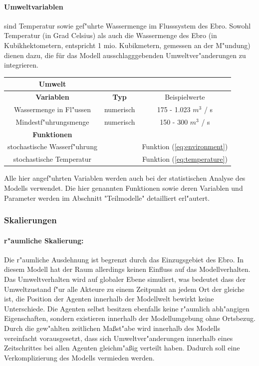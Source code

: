 \documentclass[11pt,a4paper]{article}
\begin{document}
\paragraph{Umweltvariablen}sind Temperatur sowie gef"uhrte Wassermenge im Fluss\-system des Ebro. Sowohl Temperatur (in Grad Celsius) als auch die Wassermenge des Ebro (in Kubikhektometern, entspricht 1 mio. Kubikmetern, gemessen an der M"undung) dienen dazu, die f\"ur das Modell ausschlagggebenden Umweltver"anderungen zu integrieren. \\

\begin{tabular}{|c|c|c|}
\hline \textbf{Umwelt} & & \\ 
\hline \textbf{Variablen} & \textbf{Typ} & Beispielwerte\\ 
\hline Wassermenge in Fl"ussen & numerisch & 175 - 1.023 $m^3$ / s \\ 
\hline Mindestf"uhrungsmenge & numerisch & 150 - 300 $m^3$ / s \\ 
\hline \textbf{Funktionen} & & \\ 
\hline stochastische Wasserf"uhrung & & Funktion (\ref{eq:environment})\\
\hline stochastische Temperatur & & Funktion (\ref{eq:temperature})\\
\hline 
\end{tabular}

\newline
Alle hier angef"uhrten Variablen werden auch bei der statistischen Analyse des Modells verwendet. Die hier genannten Funktionen sowie deren Variablen und Parameter werden im Abschnitt "Teilmodelle" detailliert erl"autert.\\

\subsubsection{Skalierungen}\label{sec:Skalierungen}

\paragraph*{r"aumliche Skalierung:}
Die r"aumliche Ausdehnung ist begrenzt durch das Einzugsgebiet des Ebro. In diesem Modell hat der Raum allerdings keinen Einfluss auf das Modellverhalten. Das Umweltverhalten wird auf globaler Ebene simuliert, was bedeutet dass der Umweltzustand f"ur alle Akteure zu einem Zeitpunkt an jedem Ort der gleiche ist, die Position der Agenten innerhalb der Modellwelt bewirkt keine Unterschiede. Die Agenten selbst besitzen ebenfalls keine r"aumlich abh"angigen Eigenschaften, sondern existieren innerhalb der Modellumgebung ohne Ortsbezug. Durch die gew"ahlten zeitlichen Maßst"abe wird innerhalb des Modells vereinfacht vorausgesetzt, dass sich Umweltver"anderungen innerhalb eines Zeitschrittes bei allen Agenten gleichm"aßig verteilt haben. Dadurch soll eine Verkomplizierung des Modells vermieden werden.
\end{document}
